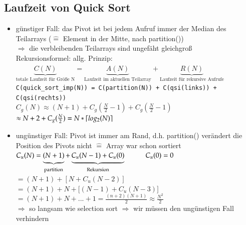 \documentclass[11pt, fleqn]{scrreprt}
\DeclarePairedDelimiter\ceil{\lceil}{\rceil}
\begin{document}
	\subsection*{Laufzeit von Quick Sort}
	\begin{itemize}
		\item günstiger Fall: das Pivot ist bei jedem Aufruf immer der Median des Teilarrays ($\widehat{=}$ Element in der Mitte, nach partition())\\
		$\Rightarrow$ die verbleibenden Teilarrays sind ungefäht gleichgroß \\
		
		Rekursionsformel: allg. Prinzip: $\underbrace{C(N)}_{\text{totale Laufzeit für Größe N}} = \underbrace{A(N)}_{\text{Laufzeit im aktuellen Teilarray}} + \underbrace{R(N)}_{\text{Laufzeit für rekursive Aufrufe}}$\\
		
		\verb|C(quick_sort_imp(N)) = C(partition(N)) + C(qsi(links)) + C(qsi(rechts))| \\
		
		\vspace*{-5mm}
		$C_g(N) \approx (N+1)+C_g(\frac{N}{2} -1) + C_g(\frac{N}{2} -1)$\\
		
		\vspace*{-5mm}
		$\approx N + 2+ C_g(\frac{N}{2}) = N*\ceil{log_2(N)}$
		
		\item ungünstiger Fall: Pivot ist immer am Rand, d.h. partition() verändert die Position des Pivots nicht $\widehat{=}$ Array war schon sortiert \\
		$C_u(N) = \underbrace{(N+1)}_{\text{partition}} + \underbrace{C_u(N - 1) + C_u(0)}_{\text{Rekursion}} \hspace*{1cm} C_u(0)=0$ \\
		
		\vspace*{-5mm}
		$ = (N+1) + [N + C_u(N-2)]$ \\
		
		\vspace*{-5mm}
		$= (N+1) + N + \biggl\lbrack(N-1) + C_u(N-3)\biggr\rbrack$ \\
		
		\vspace*{-5mm}
		$ = (N+1) + N + ... + 1 = \frac{(n+2)(N+1)}{2} \approx \frac{N^2}{2}$ \\
		\vspace*{-2mm}
		$\Rightarrow$ so langsam wie selection sort $\Rightarrow$ wir müssen den ungünstigen Fall verhindern
		

\end{itemize}
\end{document}
